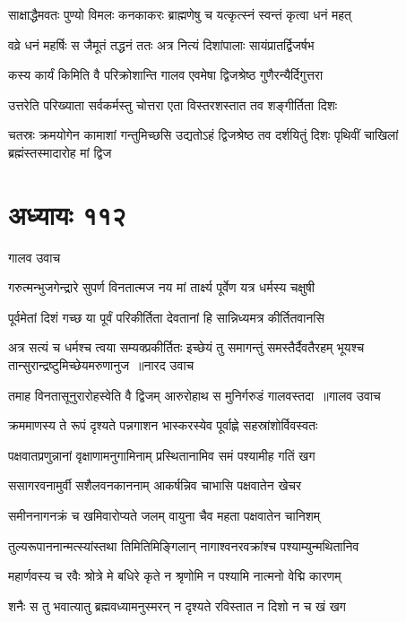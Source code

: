 \twolineshloka
{साक्षाद्धैमवतः पुण्यो विमलः कनकाकरः}
{ब्राह्मणेषु च यत्कृत्स्नं स्वन्तं कृत्वा धनं महत्}


\twolineshloka
{वव्रे धनं महर्षिः स जैमूतं तद्धनं ततः}
{अत्र नित्यं दिशांपालाः सायंप्रातर्द्विजर्षभ}


\twolineshloka
{कस्य कार्यं किमिति वै परिक्रोशान्ति गालव}
{एवमेषा द्विजश्रेष्ठ गुणैरन्यैर्दिगुत्तरा}


\twolineshloka
{उत्तरेति परिख्याता सर्वकर्मस्तु चोत्तरा}
{एता विस्तरशस्तात तव शङ्गीर्तिता दिशः}


\threelineshloka
{चतस्रः क्रमयोगेन कामाशां गन्तुमिच्छसि}
{उद्यतोऽहं द्विजश्रेष्ठ तव दर्शयितुं दिशः}
{पृथिवीं चाखिलां ब्रह्मंस्तस्मादारोह मां द्विज}


\chapter{अध्यायः ११२}
\twolineshloka
{गालव उवाच}
{}


\twolineshloka
{गरुत्मन्भुजगेन्द्रारे सुपर्ण विनतात्मज}
{नय मां तार्क्ष्य पूर्वेण यत्र धर्मस्य चक्षुषी}


\twolineshloka
{पूर्वमेतां दिशं गच्छ या पूर्वं परिकीर्तिता}
{देवतानां हि सान्निध्यमत्र कीर्तितवानसि}


\fourlineindentedshloka
{अत्र सत्यं च धर्मश्च त्वया सम्यक्प्रकीर्तितः}
{इच्छेयं तु समागन्तुं समस्तैर्दैवतैरहम्}
{भूयश्च तान्सुरान्द्रष्टुमिच्छेयमरुणानुज ॥नारद उवाच}
{}


\threelineshloka
{तमाह विनतासूनुरारोहस्वेति वै द्विजम्}
{आरुरोहाथ स मुनिर्गरुडं गालवस्तदा ॥गालव उवाच}
{}


\twolineshloka
{क्रममाणस्य ते रूपं दृश्यते पन्नगाशन}
{भास्करस्येव पूर्वाह्णे सहस्रांशोर्विवस्वतः}


\twolineshloka
{पक्षवातप्रणुन्नानां वृक्षाणामनुगामिनाम्}
{प्रस्थितानामिव समं पश्यामीह गतिं खग}


\twolineshloka
{ससागरवनामुर्वी सशैलवनकाननाम्}
{आकर्षन्निव चाभासि पक्षवातेन खेचर}


\twolineshloka
{समीननागनक्रं च खमिवारोप्यते जलम्}
{वायुना चैव महता पक्षवातेन चानिशम्}


\twolineshloka
{तुल्यरूपाननान्मत्स्यांस्तथा तिमितिमिङ्गिलान्}
{नागाश्वनरवक्रांश्च पश्याम्युन्मथितानिव}


\twolineshloka
{महार्णवस्य च रवैः श्रोत्रे मे बधिरे कृते}
{न श्रृणोमि न पश्यामि नात्मनो वेद्मि कारणम्}


\twolineshloka
{शनैः स तु भवात्यातु ब्रह्मवध्यामनुस्मरन्}
{न दृश्यते रविस्तात न दिशो न च खं खग}


